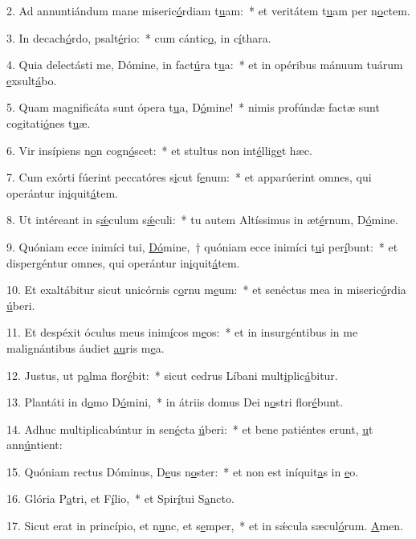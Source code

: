 2. Ad annuntiándum mane miseric\uline{ó}rdiam t\uline{u}am:~* et veritátem t\uline{u}am per n\uline{o}ctem.\par 
3. In decach\uline{ó}rdo, psalt\uline{é}rio:~* cum cántic\uline{o}, in c\uline{í}thara.\par 
4. Quia delectásti me, Dómine, in fact\uline{ú}ra t\uline{u}a:~* et in opéribus mánuum tuárum \uline{e}xsult\uline{á}bo.\par 
5. Quam magnificáta sunt ópera t\uline{u}a, D\uline{ó}mine!~* nimis profúndæ factæ sunt cogitati\uline{ó}nes t\uline{u}æ.\par 
6. Vir insípiens n\uline{o}n cogn\uline{ó}scet:~* et stultus non int\uline{é}llig\uline{e}t hæc.\par 
7. Cum exórti fúerint peccatóres s\uline{i}cut f\uline{e}num:~* et apparúerint omnes, qui operántur in\uline{i}quit\uline{á}tem.\par 
8. Ut intéreant in s\uline{ǽ}culum s\uline{ǽ}culi:~* tu autem Altíssimus in æt\uline{é}rnum, D\uline{ó}mine.\par 
9. Quóniam ecce inimíci tui, \uline{Dó}mine,~† quóniam ecce inimíci t\uline{u}i per\uline{í}bunt:~* et dispergéntur omnes, qui operántur in\uline{i}quit\uline{á}tem.\par 
10. Et exaltábitur sicut unicórnis c\uline{o}rnu m\uline{e}um:~* et senéctus mea in miseric\uline{ó}rdia \uline{ú}beri.\par 
11. Et despéxit óculus meus inim\uline{í}cos m\uline{e}os:~* et in insurgéntibus in me malignántibus áudiet \uline{au}ris m\uline{e}a.\par 
12. Justus, ut p\uline{a}lma flor\uline{é}bit:~* sicut cedrus Líbani mult\uline{i}plic\uline{á}bitur.\par 
13. Plantáti in d\uline{o}mo D\uline{ó}mini,~* in átriis domus Dei n\uline{o}stri flor\uline{é}bunt.\par 
14. Adhuc multiplicabúntur in sen\uline{é}cta \uline{ú}beri:~* et bene patiéntes erunt, \uline{u}t ann\uline{ú}ntient:\par 
15. Quóniam rectus Dóminus, D\uline{e}us n\uline{o}ster:~* et non est iníquit\uline{a}s in \uline{e}o.\par 
16. Glória P\uline{a}tri, et F\uline{í}lio,~* et Spir\uline{í}tui S\uline{a}ncto.\par 
17. Sicut erat in princípio, et n\uline{u}nc, et s\uline{e}mper,~* et in sǽcula sæcul\uline{ó}rum. \uline{A}men.\par 
